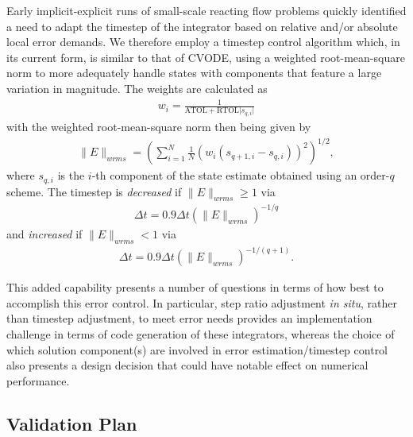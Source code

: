 Early implicit-explicit runs of small-scale reacting flow problems
quickly identified a need to adapt the timestep of the integrator based
on relative and/or absolute local error demands. We therefore employ a
timestep control algorithm which, in its current form, is similar to that of CVODE,
using a weighted root-mean-square norm to more adequately handle states with
components that feature a large variation in magnitude. The weights are calculated as
\begin{align}
w_{i} = \frac{1}{\text{ATOL} + \text{RTOL} \lvert s_{q,i} \rvert}
\end{align}
with the weighted root-mean-square norm then being given by
\begin{align}
\|E\|_{wrms} = \left(\sum_{i=1}^{N} \frac{1}{N} (w_{i}(s_{q+1,i} - s_{q,i}))^2 \right)^{1/2},
\end{align}
where $s_{q,i}$ is the $i$-th component of the state estimate obtained using an order-$q$ scheme.
The timestep is \emph{decreased} if $\|E\|_{wrms} \geq 1$ via
\begin{align}
\Delta t = 0.9\Delta t (\|E\|_{wrms})^{-1/q}
\end{align}
and \emph{increased} if $\|E\|_{wrms}<1$ via
\begin{align}
\Delta t = 0.9\Delta t (\|E\|_{wrms})^{-1/(q+1)}.
\end{align}

This added capability presents a number of
questions in terms of how best to accomplish this error control. In particular,
step ratio adjustment \emph{in situ}, rather than timestep adjustment, to meet error
needs provides an implementation challenge in terms of code generation of these
integrators, whereas the choice of which solution component(s) are involved in error
estimation/timestep control also presents a design decision that could have notable
effect on numerical performance.

\subsection{Validation Plan}

